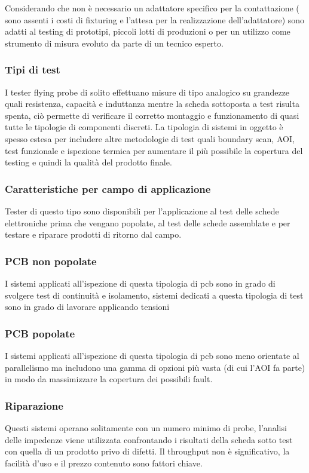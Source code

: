 Considerando che non è necessario un adattatore specifico per la contattazione ( sono assenti i costi di 
fixturing e l’attesa per la realizzazione dell’adattatore) sono adatti al testing di prototipi, piccoli lotti di produzioni o per un utilizzo come strumento di misura evoluto da parte di un tecnico esperto.  

\subsubsection{Tipi di test}

I tester flying probe di solito effettuano misure di tipo analogico su grandezze quali resistenza, capacità e induttanza mentre la scheda sottoposta a test risulta spenta, ciò permette di verificare il corretto 
montaggio e funzionamento di quasi tutte le tipologie di componenti discreti.  
La tipologia di sistemi in oggetto è spesso estesa per includere altre metodologie di test quali boundary 
scan, AOI, test funzionale e ispezione termica per aumentare il più possibile la copertura del testing e 
quindi la qualità del prodotto finale. 

\subsubsection{Caratteristiche per campo di applicazione}
Tester di questo tipo sono disponibili per l’applicazione al test delle schede elettroniche prima che 
vengano popolate, al test delle schede assemblate e per testare e riparare prodotti di ritorno dal campo. 

\subsubsection{PCB non popolate}
I sistemi applicati all’ispezione di questa tipologia di pcb sono in grado di svolgere test di continuità e 
isolamento, sistemi dedicati a questa tipologia di test sono in grado di lavorare applicando tensioni 

\subsubsection{PCB popolate}
I sistemi applicati all’ispezione di questa tipologia di pcb sono meno orientate al parallelismo ma
includono una gamma di opzioni più vasta (di cui l’AOI fa parte) in modo da massimizzare la copertura dei
possibili fault.

\subsubsection{Riparazione}
Questi sistemi operano solitamente con un numero minimo di probe, l’analisi delle impedenze viene
utilizzata confrontando i risultati della scheda sotto test con quella di un prodotto privo di difetti. Il
throughput non è significativo, la facilità d’uso e il prezzo contenuto sono fattori chiave.

